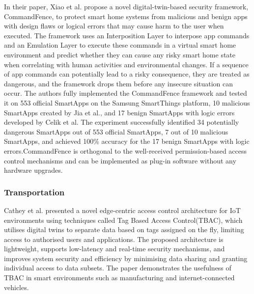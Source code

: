 In their\cite{xiaoCommandFenceNovelDigitalTwinBased2022} paper,  Xiao et al. propose a novel digital-twin-based security framework, CommandFence, to protect smart home systems from malicious and benign apps with design flaws or logical errors that may cause harm to the user when executed. The framework uses an Interposition Layer to interpose app commands and an Emulation Layer to execute these commands in a virtual smart home environment and predict whether they can cause any risky smart home state when correlating with human activities and environmental changes. If a sequence of app commands can potentially lead to a risky consequence, they are treated as dangerous, and the framework drops them before any insecure situation can occur. The authors fully implemented the CommandFence framework and tested it on 553 official SmartApps on the Samsung SmartThings platform, 10 malicious SmartApps created by Jia et al., and 17 benign SmartApps with logic errors developed by Celik et al. The experiment successfully identified 34 potentially dangerous SmartApps out of 553 official SmartApps, 7 out of 10 malicious SmartApps, and achieved 100\% accuracy for the 17 benign SmartApps with logic errors.CommandFence is orthogonal to the well-received permission-based access control mechanisms and can be implemented as plug-in software without any hardware upgrades. 

\subsubsection*{Transportation}

Cathey et al.\cite{glenandbensonjamesandguptamaanakandsandhuravicatheyEdgeCentricSecure2021} presented a novel edge-centric access control architecture for IoT environments using techniques called Tag Based Access Control(TBAC), which utilises digital twins to separate data based on tags assigned on the fly, limiting access to authorised users and applications. The proposed architecture is lightweight, supports low-latency and real-time security mechanisms, and improves system security and efficiency by minimising data sharing and granting individual access to data subsets. The paper demonstrates the usefulness of TBAC in smart environments such as manufacturing and internet-connected vehicles.

